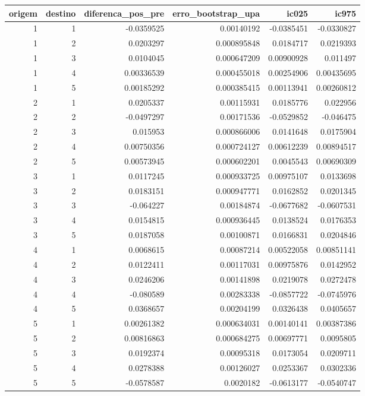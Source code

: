 \begin{tabular}{rrrrrr}
\toprule
origem & destino & diferenca\_pos\_pre & erro\_bootstrap\_upa & ic025 & ic975 \\
\midrule
1 & 1 & -0.0359525 & 0.00140192 & -0.0385451 & -0.0330827 \\
1 & 2 & 0.0203297 & 0.000895848 & 0.0184717 & 0.0219393 \\
1 & 3 & 0.0104045 & 0.000647209 & 0.00900928 & 0.011497 \\
1 & 4 & 0.00336539 & 0.000455018 & 0.00254906 & 0.00435695 \\
1 & 5 & 0.00185292 & 0.000385415 & 0.00113941 & 0.00260812 \\
2 & 1 & 0.0205337 & 0.00115931 & 0.0185776 & 0.022956 \\
2 & 2 & -0.0497297 & 0.00171536 & -0.0529852 & -0.046475 \\
2 & 3 & 0.015953 & 0.000866006 & 0.0141648 & 0.0175904 \\
2 & 4 & 0.00750356 & 0.000724127 & 0.00612239 & 0.00894517 \\
2 & 5 & 0.00573945 & 0.000602201 & 0.0045543 & 0.00690309 \\
3 & 1 & 0.0117245 & 0.000933725 & 0.00975107 & 0.0133698 \\
3 & 2 & 0.0183151 & 0.000947771 & 0.0162852 & 0.0201345 \\
3 & 3 & -0.064227 & 0.00184874 & -0.0677682 & -0.0607531 \\
3 & 4 & 0.0154815 & 0.000936445 & 0.0138524 & 0.0176353 \\
3 & 5 & 0.0187058 & 0.00100871 & 0.0166831 & 0.0204846 \\
4 & 1 & 0.0068615 & 0.00087214 & 0.00522058 & 0.00851141 \\
4 & 2 & 0.0122411 & 0.00117031 & 0.00975876 & 0.0142952 \\
4 & 3 & 0.0246206 & 0.00141898 & 0.0219078 & 0.0272478 \\
4 & 4 & -0.080589 & 0.00283338 & -0.0857722 & -0.0745976 \\
4 & 5 & 0.0368657 & 0.00204199 & 0.0326438 & 0.0405657 \\
5 & 1 & 0.00261382 & 0.000634031 & 0.00140141 & 0.00387386 \\
5 & 2 & 0.00816863 & 0.000684275 & 0.00697771 & 0.0095805 \\
5 & 3 & 0.0192374 & 0.00095318 & 0.0173054 & 0.0209711 \\
5 & 4 & 0.0278388 & 0.00126027 & 0.0253367 & 0.0302336 \\
5 & 5 & -0.0578587 & 0.0020182 & -0.0613177 & -0.0540747 \\
\bottomrule
\end{tabular}
